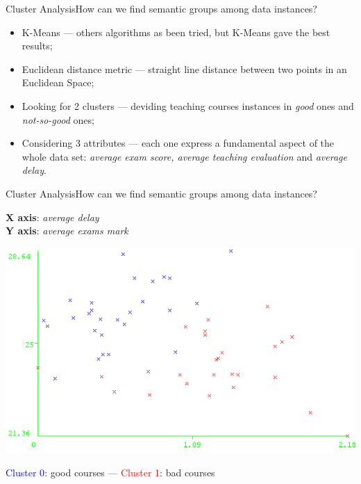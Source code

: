 \begin{frame}{Cluster Analysis}{How can we find semantic groups among data instances?}

\vspace{0.1cm}
 \vspace{0,3cm}

	\begin{block}{}
		\begin{itemize}
			\item<1-> \alert{K-Means} --- others algorithms as been tried, but K-Means gave the best results;
            \item<2-> \alert{Euclidean distance metric} --- straight line distance between two points in an Euclidean Space;
			\item<3-> \alert{Looking for 2 clusters} --- deviding teaching courses instances in \emph{good} ones and \emph{not-so-good} ones;
			\item<4-> \alert{Considering 3 attributes} --- each one express a fundamental aspect of the whole data set: \emph{average exam score, average teaching evaluation} and \emph{average delay}.
		\end{itemize}
	\end{block}

\end{frame}

\begin{frame}{Cluster Analysis}{How can we find semantic groups among data instances?}

    \textbf{X axis}: \emph{average delay} \\ \textbf{Y axis}: \emph{average exams mark}

    \vspace{0.1cm}
    \begin{centering}
        \hspace{0.5cm}\includegraphics[scale=0.46]{cluster1.png}
    \end{centering}

    \textcolor{blue}{Cluster 0}: good courses --- \textcolor{red}{Cluster 1}: bad courses

\end{frame}


